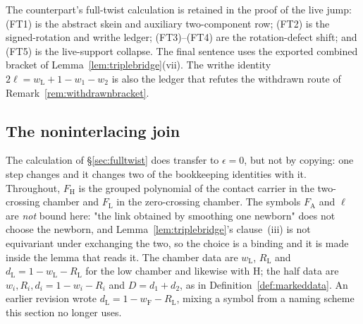 \begin{remark}[attribution]\label{rem:fulltwistsource}
The counterpart's full-twist calculation is retained in the proof of the live
jump: (FT1) is the abstract skein and auxiliary two-component row; (FT2) is the
signed-rotation and writhe ledger; (FT3)--(FT4) are the rotation-defect shift;
and (FT5) is the live-support collapse. The final sentence uses the exported
combined bracket of Lemma~\ref{lem:triplebridge}(vii). The writhe identity
$2\ell=w_{\mathrm L}+1-w_1-w_2$ is also the ledger that refutes the withdrawn
route of Remark~\ref{rem:withdrawnbracket}.
\end{remark}

\subsection{The noninterlacing join}\label{sec:nijoin}

The calculation of §\ref{sec:fulltwist} does transfer to $\epsilon=0$, but not
by copying: one step changes and it changes two of the bookkeeping identities
with it. Throughout, $F_{\mathrm H}$ is the grouped polynomial of the contact
carrier in the two-crossing chamber and $F_{\mathrm L}$ in the zero-crossing
chamber. The symbols $F_{\mathrm A}$ and $\ell$ are \emph{not} bound here:
"the link obtained by smoothing one newborn" does not choose the newborn, and
Lemma~\ref{lem:triplebridge}'s clause~(iii) is not equivariant under exchanging
the two, so the choice is a binding and it is made inside the lemma that reads
it. The chamber data are
$w_{\mathrm L}$, $R_{\mathrm L}$ and $d_{\mathrm L}=1-w_{\mathrm L}-R_{\mathrm
L}$ for the low chamber and likewise with $\mathrm H$; the half data are
$w_i,R_i,d_i=1-w_i-R_i$ and $D=d_1+d_2$, as in
Definition~\ref{def:markeddata}. An earlier revision wrote
$d_{\mathrm L}=1-w_{\mathrm F}-R_{\mathrm L}$, mixing a symbol from a naming
scheme this section no longer uses.

